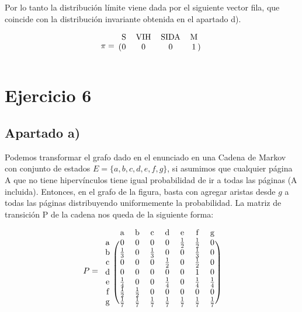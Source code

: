 \documentclass[11pt]{article}
\begin{document}
Por lo tanto la distribución límite viene dada por el siguiente vector fila, que
coincide con la distribución invariante obtenida en el apartado d).

\begin{equation*}
  \pi = 
  \begin{blockarray}{cccc}
     \text{S} & \text{VIH} & \text{SIDA} & \text{M} \\
    \begin{block}{(cccc)}
      0 & 0 & 0 & 1 \\
    \end{block}
  \end{blockarray}
\end{equation*}

\section{Ejercicio 6}

\subsection*{Apartado a)}

Podemos transformar el grafo dado en el enunciado en una Cadena de Markov
con conjunto de estados $E = \{a, b, c, d, e, f, g\}$,
si asumimos que cualquier página A que no tiene hipervínculos tiene igual 
probabilidad de ir a todas las páginas (A incluida). Entonces, en el grafo
de la figura, basta con agregar aristas desde $g$ a todas las páginas
distribuyendo uniformemente la probabilidad. 
La matriz de transición P de la cadena nos queda de la siguiente forma:

\begin{equation*}
  P = 
  \begin{blockarray}{cccccccc}
     & \text{a} & \text{b} & \text{c} & \text{d} & \text{e} & \text{f} & \text{g} \\
    \begin{block}{c(ccccccc)}
      \text{a} & 0           & 0           & 0           & 0           & \frac{1}{2} & \frac{1}{2} & 0 \\
      \text{b} & \frac{1}{3} & 0           & \frac{1}{3} & 0           & 0           & \frac{1}{3} & 0 \\
      \text{c} & 0           & 0           & 0           & \frac{1}{2} & 0           & \frac{1}{2} & 0 \\
      \text{d} & 0           & 0           & 0           & 0           & 0           & 1           & 0 \\
      \text{e} & \frac{1}{4} & 0           & 0           & \frac{1}{4} & 0           & \frac{1}{4} & \frac{1}{4} \\
      \text{f} & \frac{1}{2} & \frac{1}{2} & 0           & 0           & 0           & 0           & 0 \\
      \text{g} & \frac{1}{7} & \frac{1}{7} & \frac{1}{7} & \frac{1}{7} & \frac{1}{7} & \frac{1}{7} & \frac{1}{7} \\
    \end{block}
  \end{blockarray}
\end{equation*}
\end{document}
